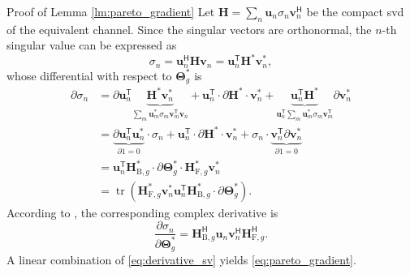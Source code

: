 \documentclass[journal]{IEEEtran}
\DeclareMathOperator{\tr}{tr}
\begin{document}
\begin{appendix}
	\begin{subsection}{Proof of Lemma \ref{lm:pareto_gradient}}\label{ap:pareto_gradient}
		Let $\mathbf{H} = \sum_n \mathbf{u}_n \sigma_n \mathbf{v}_n^\mathsf{H}$ be the compact \gls{svd} of the equivalent channel.
		Since the singular vectors are orthonormal, the $n$-th singular value can be expressed as
		\begin{equation}
			\sigma_n = \mathbf{u}_n^\mathsf{H} \mathbf{H} \mathbf{v}_n = \mathbf{u}_n^\mathsf{T} \mathbf{H}^* \mathbf{v}_n^*,
		\end{equation}
		whose differential with respect to $\mathbf{\Theta}_g^*$ is
		\begin{align*}
			\partial \sigma_n
			 & = \partial \mathbf{u}_n^\mathsf{T} \underbrace{\mathbf{H}^* \mathbf{v}_n^*}_{\sum_m \mathbf{u}_m^* \sigma_m \mathbf{v}_m^\mathsf{T} \mathbf{v}_n} + \mathbf{u}_n^\mathsf{T} \cdot \partial \mathbf{H}^* \cdot \mathbf{v}_n^* + \underbrace{\mathbf{u}_n^\mathsf{T} \mathbf{H}^*}_{\mathbf{u}_n^\mathsf{T} \sum_m \mathbf{u}_m^* \sigma_m \mathbf{v}_m^\mathsf{T}} \partial \mathbf{v}_n^* \\
			 & = \underbrace{\partial \mathbf{u}_n^\mathsf{T} \mathbf{u}_n^*}_{\partial 1 = 0} \cdot \sigma_n + \mathbf{u}_n^\mathsf{T} \cdot \partial \mathbf{H}^* \cdot \mathbf{v}_n^* + \sigma_n \cdot \underbrace{\mathbf{v}_n^\mathsf{T} \partial \mathbf{v}_n^*}_{\partial 1 = 0}                                                                                                                  \\
			 & = \mathbf{u}_n^\mathsf{T} \mathbf{H}_{\mathrm{B},g}^* \cdot \partial \mathbf{\Theta}_g^* \cdot \mathbf{H}_{\mathrm{F},g}^* \mathbf{v}_n^*                                                                                                                                                                                                                                                 \\
			 & = \tr(\mathbf{H}_{\mathrm{F},g}^* \mathbf{v}_n^*\mathbf{u}_n^\mathsf{T} \mathbf{H}_{\mathrm{B},g}^* \cdot \partial \mathbf{\Theta}_g^*).
		\end{align*}
		According to \cite{Hjorungnes2007}, the corresponding complex derivative is
		\begin{equation}
			\frac{\partial \sigma_n}{\partial \mathbf{\Theta}_g^*} = \mathbf{H}_{\mathrm{B},g}^\mathsf{H} \mathbf{u}_n \mathbf{v}_n^\mathsf{H} \mathbf{H}_{\mathrm{F},g}^\mathsf{H}.
			\label{eq:derivative_sv}
		\end{equation}
		A linear combination of \eqref{eq:derivative_sv} yields \eqref{eq:pareto_gradient}.
	\end{subsection}



\end{appendix}
\end{document}
